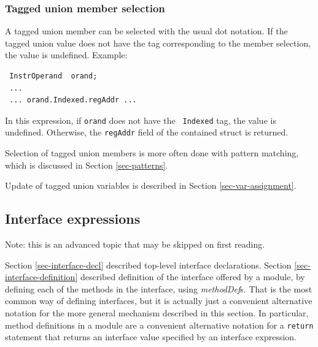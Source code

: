 \documentclass[twoside,letterpaper]{article}
\newcommand{\nterm}[1]{\emph{#1}}
\begin{document}

\subsubsection{Tagged union member selection}

\label{sec-union-select}

A tagged union member can be selected with the usual dot notation.
 If the tagged union value does not have
the tag corresponding to the member selection, the value is undefined.
Example:
\begin{verbatim}
 InstrOperand  orand;
 ...
 ... orand.Indexed.regAddr ...
\end{verbatim}
In this expression, if \texttt{orand} does not have the {\tt
Indexed} tag, the value is undefined.  Otherwise, the \texttt{regAddr} field
of the contained struct is returned.

Selection of tagged union members is more often done with pattern
matching, which is discussed in Section \ref{sec-patterns}.

Update of tagged union variables is described in Section
{\ref{sec-var-assignment}}.


\subsection{Interface expressions}

\label{sec-interface-exprs}


Note: this is an advanced topic that may be skipped on first reading.

Section \ref{sec-interface-decl} described top-level interface
declarations.  Section \ref{sec-interface-definition} described
definition of the interface offered by a module, by defining each of
the methods in the interface, using \nterm{methodDef}s.  That is the
most common way of defining interfaces, but it is actually just a
convenient alternative notation for the more general mechanism
described in this section.  In particular, method definitions in a
module are a convenient alternative notation for a \texttt{return}
statement that returns an interface value specified by an interface
expression.
\end{document}
